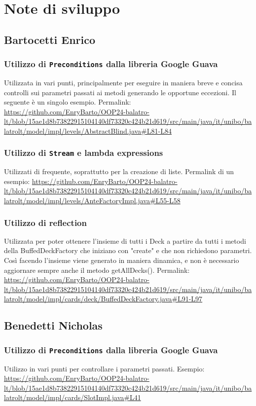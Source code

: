 \documentclass[a4paper,12pt]{report}
\begin{document}
\section{Note di sviluppo}

\subsection{Bartocetti Enrico}
\subsubsection{Utilizzo di \texttt{Preconditions} dalla libreria Google Guava}
Utilizzata in vari punti, principalmente per eseguire in maniera breve e concisa controlli sui parametri passati ai metodi generando le opportune eccezioni. Il seguente è un singolo esempio. Permalink: \url{https://github.com/EnryBarto/OOP24-balatro-lt/blob/15ae1d8b73822915104140df73320c424b21d619/src/main/java/it/unibo/balatrolt/model/impl/levels/AbstractBlind.java#L81-L84}
\subsubsection{Utilizzo di \texttt{Stream} e lambda expressions}
Utilizzati di frequente, soprattutto per la creazione di liste. Permalink di un esempio: \url{https://github.com/EnryBarto/OOP24-balatro-lt/blob/15ae1d8b73822915104140df73320c424b21d619/src/main/java/it/unibo/balatrolt/model/impl/levels/AnteFactoryImpl.java#L55-L58}
\subsubsection{Utilizzo di reflection}
Utilizzata per poter ottenere l’insieme di tutti i Deck a partire da tutti i metodi della BuffedDeckFactory che iniziano con "create" e che non richiedono parametri.
Così facendo l’insieme viene generato in maniera dinamica, e non è necessario aggiornare sempre anche il metodo getAllDecks(). Permalink: \url{https://github.com/EnryBarto/OOP24-balatro-lt/blob/15ae1d8b73822915104140df73320c424b21d619/src/main/java/it/unibo/balatrolt/model/impl/cards/deck/BuffedDeckFactory.java#L91-L97}

\subsection{Benedetti Nicholas}
\subsubsection{Utilizzo di \texttt{Preconditions} dalla libreria Google Guava}
Utilizzo in vari punti per controllare i parametri passati. Esempio: \url{https://github.com/EnryBarto/OOP24-balatro-lt/blob/15ae1d8b73822915104140df73320c424b21d619/src/main/java/it/unibo/balatrolt/model/impl/cards/SlotImpl.java#L41}
\end{document}

